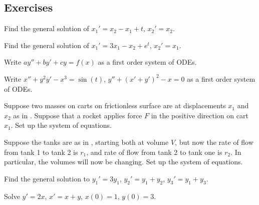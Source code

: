\subsection{Exercises}

\begin{exercise}
Find the general solution of $x_1' = x_2 - x_1 + t$, $x_2' = x_2$.
\end{exercise}

\begin{exercise}
Find the general solution of $x_1' = 3 x_1 - x_2 + e^t$, $x_2' = x_1$.
\end{exercise}

\begin{exercise}
Write $ay'' + by' + cy = f(x)$
as a first order system of ODEs.
\end{exercise}

\begin{exercise}
Write $x'' + y^2 y' - x^3 = \sin(t)$, 
$y'' + {(x'+y')}^2 -x = 0$ as a first order system of ODEs.
\end{exercise}

\begin{exercise}
Suppose two masses on carts on frictionless surface are at 
displacements $x_1$ and $x_2$ as in .
Suppose that a rocket applies force $F$ in the positive direction on cart
$x_1$.  Set up the system of equations.
\end{exercise}

\begin{exercise}
Suppose the tanks are as in 
, starting both at volume $V$,
but now the rate of flow from tank 1 to tank 2 is $r_1$, and
rate of flow from tank 2 to tank one is $r_2$.  In particular,
the volumes will now be changing.  Set up the system of equations.
\end{exercise}

\setcounter{exercise}{100}

\begin{exercise}
Find the general solution to $y_1' = 3 y_1$, $y_2' = y_1 + y_2$,
$y_3' = y_1 + y_3$.
\end{exercise}

\begin{exercise}
Solve $y'=2x$, $x'=x+y$, $x(0)=1$, $y(0)=3$.
\end{exercise}

